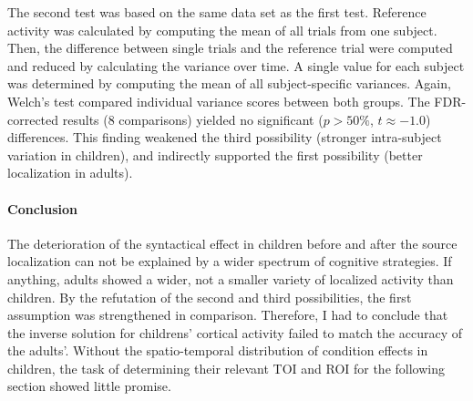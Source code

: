 The second test was based on the same data set as the first test.
Reference activity was calculated by computing the mean of all trials from one subject.
Then, the difference between single trials and the reference trial were computed and reduced by calculating the variance over time.
A single value for each subject was determined by computing the mean of all subject-specific variances.
Again, Welch's test compared individual variance scores between both groups.
The FDR-corrected results (8 comparisons) yielded no significant ($p > 50\%$, $t \approx -1.0$) differences.
This finding weakened the third possibility (stronger intra-subject variation in children), and indirectly supported the first possibility (better localization in adults).

\paragraph{Conclusion}
The deterioration of the syntactical effect in children before and after the source localization can not be explained by a wider spectrum of cognitive strategies.
If anything, adults showed a wider, not a smaller variety of localized activity than children.
By the refutation of the second and third possibilities, the first assumption was strengthened in comparison.
Therefore, I had to conclude that the inverse solution for childrens' cortical activity failed to match the accuracy of the adults'.
Without the spatio-temporal distribution of condition effects in children, the task of determining their relevant TOI and ROI for the following section showed little promise.